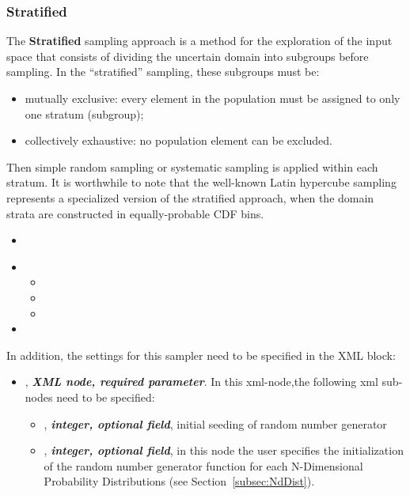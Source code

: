 \subsubsection{Stratified}
\label{subsubsubsec:Stratified}
The \textbf{Stratified} sampling approach is a method for the exploration of the
input space that consists of dividing the uncertain domain into subgroups before
sampling.
%
In the ``stratified'' sampling, these subgroups must be:
\begin{itemize}
 \item mutually exclusive: every element in the population must be assigned to
   only one stratum (subgroup);
 \item collectively exhaustive: no population element can be excluded.
\end{itemize}

Then simple random sampling or systematic sampling is applied within each
stratum.
%
It is worthwhile to note that the well-known Latin hypercube sampling represents
a specialized version of the stratified approach, when the domain strata are
constructed in equally-probable CDF bins.

%
\attrIntro
\begin{itemize}
\itemsep0em
\item \nameDescription
\end{itemize}
\begin{itemize}
\item \variableDescription
 \variableChildrenIntro
 \begin{itemize}
    \item \distributionDescription
    \item \functionDescription
    \item \gridDescription
  \end{itemize}
\item \constantVariablesDescription
\end{itemize}
In addition, the settings for this sampler need to be specified in the  XML block:
\begin{itemize}
\item {},  \textit{\textbf{XML node, required parameter}}. In this xml-node,the following xml sub-nodes need to be specified:
  \begin{itemize}
    \item {}, \textit{\textbf{integer, optional field}}, initial seeding of random number generator
    \item {},  \textit{\textbf{integer, optional field}}, in this node the user specifies the initialization of the random number generator function for each N-Dimensional Probability Distributions (see Section~\ref{subsec:NdDist}).
  \end{itemize}
\end{itemize}

